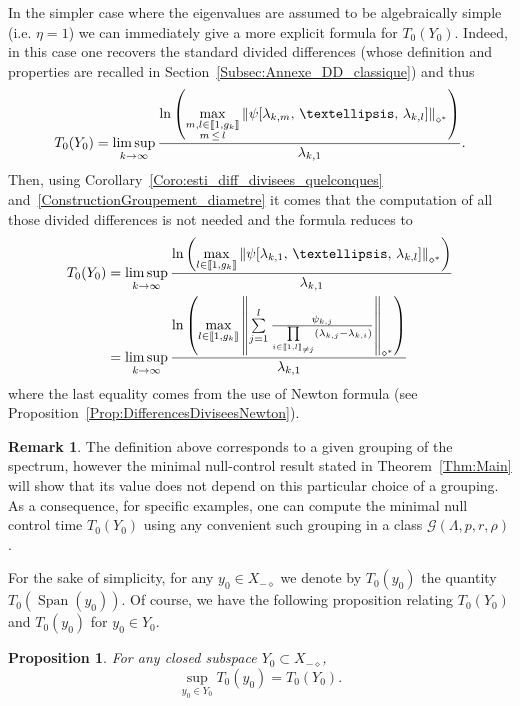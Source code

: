 \documentclass[11pt]{article}
\newtheorem{prop}[theo]{Proposition}
\theoremstyle{definition}
\newtheorem{rema}[theo]{Remark}
\numberwithin{equation}{section}
\numberwithin{figure}{section}
\numberwithin{table}{section}
\newcommand{\llbracket}{\mathopen{[\mkern -2.7mu[}}
\newcommand{\rrbracket}{\mathclose{]\mkern -2.7mu]}}
\newcommand{\inter}[2]{\llbracket #1,#2 \rrbracket}
\newcommand{\interexclu}[3]{\llbracket #1,#2\rrbracket_{\neq #3}}
\newcommand{\Xmalpha}{X_{-\diamond}}
\newcommand{\Fzp}{Y_0}
\newcommand{\normeXalphas}[1]{\left\| #1 \right\|_{\diamond^*}}
\newcommand{\n}{g}
\DeclareMathOperator{\Span}{Span}
\begin{document}
In the simpler case where the eigenvalues are assumed to be algebraically simple (i.e. $\eta =1$) we can immediately give a more explicit formula for $T_0(\Fzp)$. Indeed, in this case one recovers the standard divided differences (whose definition and properties are recalled in Section~\ref{Subsec:Annexe_DD_classique}) and thus
\begin{equation}\label{Def:TempsMinimal_DifferencesDivisees_casgeneral}
T_0(\Fzp) = \limsup_{k\to \infty} \frac{\ln \left(\max\limits_{\substack{m,l\in \inter{1}{\n_k} \\ m\,\leq\,l}} \normeXalphas{ \psi[\lambda_{k,m},\,\dots,\,\lambda_{k,l}] } \right)}{\lambda_{k,1}}.
\end{equation}
Then, using Corollary~\ref{Coro:esti_diff_divisees_quelconques} and~\eqref{ConstructionGroupement_diametre} it comes that the computation of all those divided differences is not needed and the formula reduces to
\begin{align}\label{Def:TempsMinimal_DifferencesDivisees}
T_0 (\Fzp) &= \limsup_{k \to \infty} \frac{\ln \left(\max\limits_{l\in \inter{1}{\n_k}} \normeXalphas{ \psi[\lambda_{k,1},\, \dots,\,\lambda_{k,l}] } \right)}{\lambda_{k,1}}
\\
&=\limsup_{k\to \infty} \frac{\ln \left(\max\limits_{l\in \inter{1}{\n_k}} \normeXalphas{\sum\limits_{j=1}^l \frac{ \psi_{k,j} }{\prod\limits_{i\in \interexclu{1}{l}{j}} (\lambda_{k,j}-\lambda_{k,i})} } \right)}{\lambda_{k,1}}\label{Def:T0}
\end{align}
where the last equality comes from the use of Newton formula (see Proposition~\ref{Prop:DifferencesDiviseesNewton}).



\begin{rema}
The definition above corresponds to a given grouping of the spectrum, however the minimal null-control result stated in Theorem~\ref{Thm:Main} will show that its value does not depend on this particular choice of a grouping. As a consequence, for specific examples, one can compute the minimal null control time $T_0(\Fzp)$ using any convenient such grouping in a class $\mathcal{G}(\Lambda,p,r,\rho)$.
\end{rema}


For the sake of simplicity, for any $y_0 \in \Xmalpha$ we denote by $T_0(y_0)$ the quantity $T_0(\Span(y_0))$. Of course, we have the following proposition relating $T_0(\Fzp)$ and $T_0(y_0)$ for $y_0 \in \Fzp$.

\begin{prop}\label{Prop:Sup_TempsMinimaux}
For any closed subspace $\Fzp \subset \Xmalpha$,
\[
\sup_{y_0 \in \Fzp} T_0(y_0) = T_0(\Fzp).
\]
\end{prop}
\end{document}

